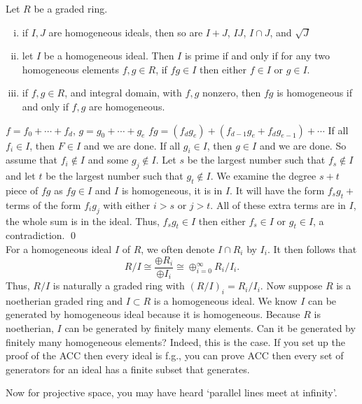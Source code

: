 \begin{prop}
Let $R$ be a graded ring.
\begin{enumerate}[(i)]
\item if $I, J$ are homogeneous ideals, then so are $I+J$, $IJ$, $I \cap J$, and $\sqrt{J}$
\item let $I$ be a homogeneous ideal. Then $I$ is prime if and only if for any two homogeneous elements $f,g \in R$, if $fg \in I$ then either $f \in I$ or $g \in I$. 
\item if $f,g \in R$, and integral domain, with $f,g$ nonzero, then $fg$ is homogeneous if and only if $f,g$ are homogeneous. 
\end{enumerate}
\end{prop}


\pf 

$f= f_0 + \cdots + f_d$, $g= g_0 + \cdots+ g_e$
$fg= (f_dg_e) + (f_{d-1}g_e+ f_dg_{e-1}) + \cdots$
If all $f_i \in I$, then $F \in I$ and we are done.
If all $g_i \in I$, then $g \in I$ and we are done.
So assume that $f_i \notin I$ and some $g_j \notin I$.
Let $s$ be the largest number such that $f_s \notin I$ and let $t$ be the largest number such that $g_t \notin I$. We examine the degree $s+t$ piece of $fg$ as $fg \in I$ and $I$ is homogeneous, it is in $I$. It will have the form $f_sg_t+$ terms of the form $f_ig_j$ with either $i>s$ or $j>t$. All of these extra terms are in $I$, the whole sum is in the ideal. Thus, $f_sg_t \in I$ then either $f_s \in I$ or $g_t \in I$, a contradiction. \qed \\


For a homogeneous ideal $I$ of $R$, we often denote $I \cap R_i$ by $I_i$. It then follows that 
	\[
	R/I \cong \dfrac{\oplus R_i}{\oplus I_i} \cong \oplus_{i=0}^\infty R_i/I_i.
	\]
Thus, $R/I$ is naturally a graded ring with $(R/I)_i = R_i/I_i$. Now suppose $R$ is a noetherian graded ring and $I \subset R$ is a homogeneous ideal. We know $I$ can be generated by homogeneous ideal because it is homogeneous. Because $R$ is noetherian, $I$ can be generated by finitely many elements. Can it be generated by finitely many homogeneous elements? Indeed, this is the case. If you set up the proof of the ACC then every ideal is f.g., you can prove ACC then every set of generators for an ideal has a finite subset that generates. 



Now for projective space, you may have heard `parallel lines meet at infinity'. 


